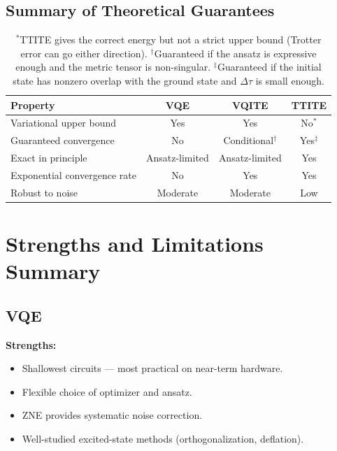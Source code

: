 \documentclass[11pt,a4paper]{article}
\begin{document}
\subsection{Summary of Theoretical Guarantees}

\begin{table}[h]
\centering
\small
\begin{tabular}{@{}l c c c@{}}
\toprule
Property & VQE & VQITE & TTITE \\
\midrule
Variational upper bound & Yes & Yes & No$^*$ \\
Guaranteed convergence & No & Conditional$^\dagger$ & Yes$^\ddagger$ \\
Exact in principle & Ansatz-limited & Ansatz-limited & Yes \\
Exponential convergence rate & No & Yes & Yes \\
Robust to noise & Moderate & Moderate & Low \\
\bottomrule
\end{tabular}
\caption{$^*$TTITE gives the correct energy but not a strict upper bound
(Trotter error can go either direction).  $^\dagger$Guaranteed if the
ansatz is expressive enough and the metric tensor is non-singular.
$^\ddagger$Guaranteed if the initial state has nonzero overlap with the
ground state and $\Delta\tau$ is small enough.}
\end{table}


\section{Strengths and Limitations Summary}
\label{sec:strengths}

\subsection{VQE}

\textbf{Strengths:}
\begin{itemize}[nosep]
  \item Shallowest circuits --- most practical on near-term hardware.
  \item Flexible choice of optimizer and ansatz.
  \item ZNE provides systematic noise correction.
  \item Well-studied excited-state methods (orthogonalization, deflation).
\end{itemize}
\end{document}
